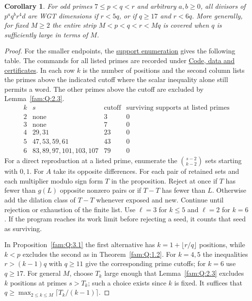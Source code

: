 \documentclass[11pt,a4paper]{article}
\numberwithin{equation}{section}
\newtheorem{corollary}[theorem]{Corollary}
\theoremstyle{remark}
\begin{document}
\begin{corollary}\label{fam:A:strips}
For odd primes $7\le p<q<r$ and arbitrary $a,b\ge0$, all divisors of
$p^a q^b r^4d$ are WGT dimensions if $r<5q$, or if $q\ge17$ and
$r<6q$. More generally, for fixed $M\ge2$ the entire strip
$M<p<q<r<Mq$ is covered when $q$ is sufficiently large in terms of $M$.
\end{corollary}
\begin{proof}
For the smaller endpoints, the \href{https://github.com/sebastienpalcoux/WGT-fusion-categories/blob/f7f9f9a02f3116e61eb9dca4eebfed77001494e8/code/exposed_support.py}{support enumeration} gives the following table. The commands for all listed primes are recorded under \hyperref[sec:code-data-certificates]{Code, data and certificates}. In each row
$k$ is the number of positions and the second column lists the primes
above the indicated cutoff where the scalar inequality alone still
permits a word. The other primes above the cutoff are excluded by
Lemma~\ref{fam:Q:2.3}.
\[
\begin{array}{c|l|r|c}
k &s &\text{cutoff}&\text{surviving supports at listed primes}\\\hline
2&\text{none}&3&0\\
3&\text{none}&7&0\\
4&29,31&23&0\\
5&47,53,59,61&43&0\\
6&83,89,97,101,103,107&79&0
\end{array}
\]
For a direct reproduction at a listed prime, enumerate the
$\binom{s-2}{k-2}$ sets starting with $0,1$. For $A$ take its
opposite differences. For each pair of retained sets and each
multiplier modulo sign form $T$ in the proposition. Reject at once
if $T$ has fewer than $g(L)$ opposite nonzero pairs or if $T-T$ has
fewer than $L$. Otherwise add the dilation class of $T-T$ whenever
exposed and new. Continue until rejection or exhaustion of the finite
list. Use $\ell=3$ for $k\le5$ and $\ell=2$ for $k=6$.
If the program reaches its work limit before rejecting a seed, it counts that seed as surviving.

In Proposition~\ref{fam:Q:3.1} the first alternative has
$k=1+\lfloor r/q\rfloor$ positions, while $k<p$ excludes the second
as in Theorem~\ref{fam:Q:1.2}. For $k=4,5$ the inequalities
$r>(k-1)q$ with $q\ge11$ give the corresponding prime cutoffs; for
$k=6$ use $q\ge17$. For general $M$, choose $T_k$ large enough
that Lemma~\ref{fam:Q:2.3} excludes $k$ positions at primes $s>T_k$;
such a choice exists since $k$ is fixed. It suffices that
$q\ge\max_{2\le k\le M}\lceil T_k/(k-1)\rceil$.
\end{proof}
\end{document}
